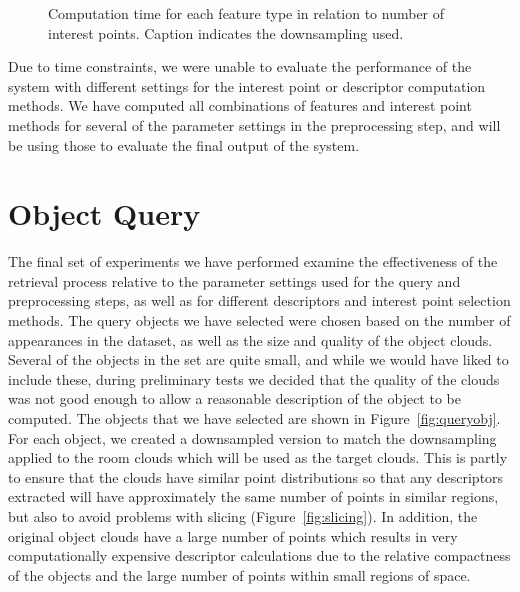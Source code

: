 \documentclass[11pt,a4paper]{kth-mag}
\begin{document}
\begin{figure}
  \caption{Computation time for each feature type in relation to number of
    interest points. Caption indicates the downsampling used.}
  \label{fig:feature_agg}
\end{figure}

Due to time constraints, we were unable to evaluate the performance of the
system with different settings for the interest point or descriptor computation
methods. We have computed all combinations of features and interest point
methods for several of the parameter settings in the preprocessing step, and
will be using those to evaluate the final output of the system.

\newpage
\section{Object Query}
\label{queryexp}
The final set of experiments we have performed examine the effectiveness of the
retrieval process relative to the parameter settings used for the query and
preprocessing steps, as well as for different descriptors and interest point
selection methods. The query objects we have selected were chosen based on the
number of appearances in the dataset, as well as the size and quality of the
object clouds. Several of the objects in the set are quite small, and while we
would have liked to include these, during preliminary tests we decided that the
quality of the clouds was not good enough to allow a reasonable description of
the object to be computed. The objects that we have selected are shown in
Figure~\ref{fig:queryobj}. For each object, we created a downsampled version to
match the downsampling applied to the room clouds which will be used as the
target clouds. This is partly to ensure that the clouds have similar point
distributions so that any descriptors extracted will have approximately the same
number of points in similar regions, but also to avoid problems with slicing
(Figure~\ref{fig:slicing}). In addition, the original object clouds have a large
number of points which results in very computationally expensive descriptor
calculations due to the relative compactness of the objects and the large number
of points within small regions of space.
\end{document}
